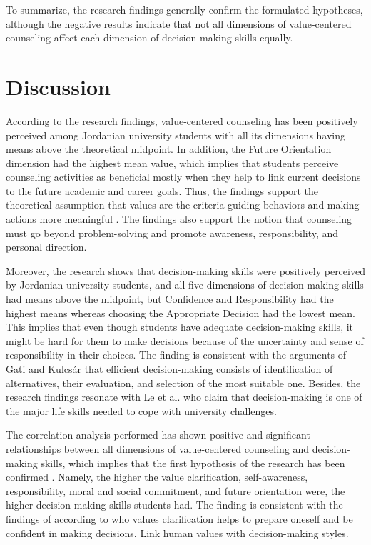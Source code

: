 \documentclass[10pt]{NSP1}
\begin{document}
To summarize, the research findings generally confirm the formulated hypotheses, although the negative results indicate that not all dimensions of value-centered counseling affect each dimension of decision-making skills equally.

\section{Discussion}

According to the research findings, value-centered counseling has been positively perceived among Jordanian university students with all its dimensions having means above the theoretical midpoint. In addition, the Future Orientation dimension had the highest mean value, which implies that students perceive counseling activities as beneficial mostly when they help to link current decisions to the future academic and career goals. Thus, the findings support the theoretical assumption that values are the criteria guiding behaviors and making actions more meaningful \cite{ref11,ref14}. The findings also support the notion that counseling must go beyond problem-solving and promote awareness, responsibility, and personal direction.

Moreover, the research shows that decision-making skills were positively perceived by Jordanian university students, and all five dimensions of decision-making skills had means above the midpoint, but Confidence and Responsibility had the highest means whereas choosing the Appropriate Decision had the lowest mean. This implies that even though students have adequate decision-making skills, it might be hard for them to make decisions because of the uncertainty and sense of responsibility in their choices. The finding is consistent with the arguments of Gati and Kulcsár \cite{ref15} that efficient decision-making consists of identification of alternatives, their evaluation, and selection of the most suitable one. Besides, the research findings resonate with Le et al. \cite{ref35} who claim that decision-making is one of the major life skills needed to cope with university challenges.

The correlation analysis performed has shown positive and significant relationships between all dimensions of value-centered counseling and decision-making skills, which implies that the first hypothesis of the research has been confirmed \cite{ref40}. Namely, the higher the value clarification, self-awareness, responsibility, moral and social commitment, and future orientation were, the higher decision-making skills students had. The finding is consistent with the findings of \cite{ref3} according to who values clarification helps to prepare oneself and be confident in making decisions. \cite{ref36} Link human values with decision-making styles.
\end{document}
